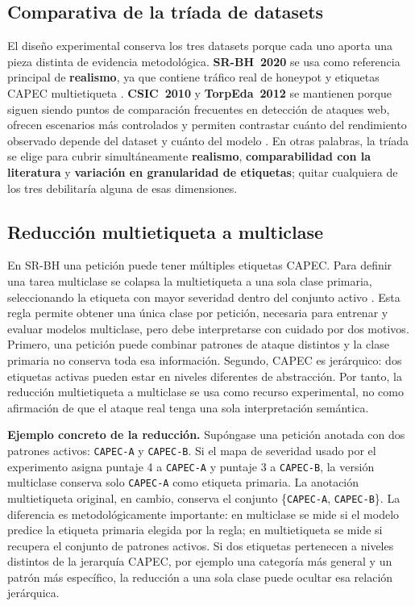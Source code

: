 \documentclass[12pt,oneside]{report}
\begin{document}
\subsection{Comparativa de la tríada de datasets}
El diseño experimental conserva los tres datasets porque cada uno aporta una pieza distinta de evidencia metodológica. \textbf{SR-BH~2020} se usa como referencia principal de \textbf{realismo}, ya que contiene tráfico real de honeypot y etiquetas CAPEC multietiqueta \cite{srbh_dataverse,srbh_paper}. \textbf{CSIC~2010} y \textbf{TorpEda~2012} se mantienen porque siguen siendo puntos de comparación frecuentes en detección de ataques web, ofrecen escenarios más controlados y permiten contrastar cuánto del rendimiento observado depende del dataset y cuánto del modelo \cite{csic2010_impact,csic2010_doc,torpeda_2012}. En otras palabras, la tríada se elige para cubrir simultáneamente \textbf{realismo}, \textbf{comparabilidad con la literatura} y \textbf{variación en granularidad de etiquetas}; quitar cualquiera de los tres debilitaría alguna de esas dimensiones.

\subsection{Reducción multietiqueta a multiclase}
En SR-BH una petición puede tener múltiples etiquetas CAPEC. Para definir una tarea multiclase se colapsa la multietiqueta a una sola clase primaria, seleccionando la etiqueta con mayor severidad dentro del conjunto activo \cite{capec_schema_docs,capec_schema_desc}. Esta regla permite obtener una única clase por petición, necesaria para entrenar y evaluar modelos multiclase, pero debe interpretarse con cuidado por dos motivos. Primero, una petición puede combinar patrones de ataque distintos y la clase primaria no conserva toda esa información. Segundo, CAPEC es jerárquico: dos etiquetas activas pueden estar en niveles diferentes de abstracción. Por tanto, la reducción multietiqueta a multiclase se usa como recurso experimental, no como afirmación de que el ataque real tenga una sola interpretación semántica.

\textbf{Ejemplo concreto de la reducción.} Supóngase una petición anotada con dos patrones activos: \texttt{CAPEC-A} y \texttt{CAPEC-B}. Si el mapa de severidad usado por el experimento asigna puntaje 4 a \texttt{CAPEC-A} y puntaje 3 a \texttt{CAPEC-B}, la versión multiclase conserva solo \texttt{CAPEC-A} como etiqueta primaria. La anotación multietiqueta original, en cambio, conserva el conjunto \{\texttt{CAPEC-A}, \texttt{CAPEC-B}\}. La diferencia es metodológicamente importante: en multiclase se mide si el modelo predice la etiqueta primaria elegida por la regla; en multietiqueta se mide si recupera el conjunto de patrones activos. Si dos etiquetas pertenecen a niveles distintos de la jerarquía CAPEC, por ejemplo una categoría más general y un patrón más específico, la reducción a una sola clase puede ocultar esa relación jerárquica.
\end{document}
